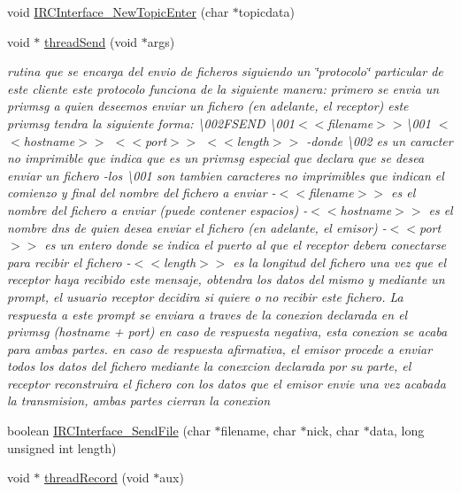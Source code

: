 \begin{DoxyCompactItemize}
\item 
void \hyperlink{_g-2301-05-_p2-xchat2_8c_a080cf34ff506481737f6d08af60ca92b}{I\-R\-C\-Interface\-\_\-\-New\-Topic\-Enter} (char $\ast$topicdata)
\item 
void $\ast$ \hyperlink{_g-2301-05-_p2-xchat2_8c_ab5edba0766b7dde73e1a1d7595b9c42d}{thread\-Send} (void $\ast$args)
\begin{DoxyCompactList}\small\item\em rutina que se encarga del envio de ficheros siguiendo un \char`\"{}protocolo\char`\"{} particular de este cliente este protocolo funciona de la siguiente manera\-: primero se envia un privmsg a quien deseemos enviar un fichero (en adelante, el receptor) este privmsg tendra la siguiente forma\-: \textbackslash{}002\-F\-S\-E\-N\-D \textbackslash{}001$<$$<$filename$>$$>$\textbackslash{}001 $<$$<$hostname$>$$>$ $<$$<$port$>$$>$ $<$$<$length$>$$>$ -\/donde \textbackslash{}002 es un caracter no imprimible que indica que es un privmsg especial que declara que se desea enviar un fichero -\/los \textbackslash{}001 son tambien caracteres no imprimibles que indican el comienzo y final del nombre del fichero a enviar -\/$<$$<$filename$>$$>$ es el nombre del fichero a enviar (puede contener espacios) -\/$<$$<$hostname$>$$>$ es el nombre dns de quien desea enviar el fichero (en adelante, el emisor) -\/$<$$<$port$>$$>$ es un entero donde se indica el puerto al que el receptor debera conectarse para recibir el fichero -\/$<$$<$length$>$$>$ es la longitud del fichero una vez que el receptor haya recibido este mensaje, obtendra los datos del mismo y mediante un prompt, el usuario receptor decidira si quiere o no recibir este fichero. La respuesta a este prompt se enviara a traves de la conexion declarada en el privmsg (hostname + port) en caso de respuesta negativa, esta conexion se acaba para ambas partes. en caso de respuesta afirmativa, el emisor procede a enviar todos los datos del fichero mediante la conexcion declarada por su parte, el receptor reconstruira el fichero con los datos que el emisor envie una vez acabada la transmision, ambas partes cierran la conexion \end{DoxyCompactList}\item 
boolean \hyperlink{_g-2301-05-_p2-xchat2_8c_a100f1c87bb3b399a7284e62dd2e6172a}{I\-R\-C\-Interface\-\_\-\-Send\-File} (char $\ast$filename, char $\ast$nick, char $\ast$data, long unsigned int length)
\item 
void $\ast$ \hyperlink{_g-2301-05-_p2-xchat2_8c_af38dd8b519a209e19f3b39aa7366bcda}{thread\-Record} (void $\ast$aux)

\end{DoxyCompactItemize}
